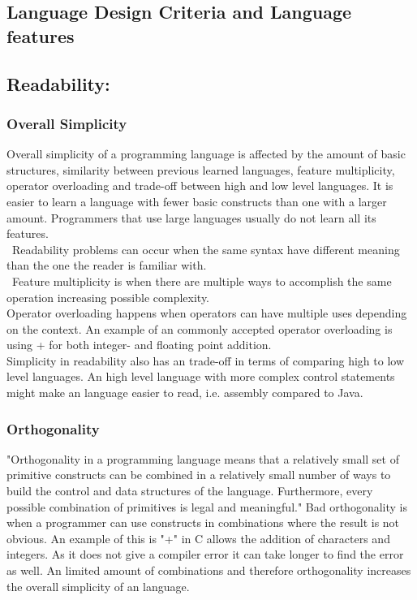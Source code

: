 \subsection{Language Design Criteria and Language features}
\label{language-design-criteria}
\label{design-criteria-theory}
\subsection*{Readability:}
\subsubsection*{Overall Simplicity}
Overall simplicity of a programming language is affected by the amount of basic structures, similarity between previous learned languages, feature multiplicity, operator overloading and trade-off between high and low level languages.
It is easier to learn a language with fewer basic constructs than one with a larger amount. Programmers that use large languages usually do not learn all its features. \\\
Readability problems can occur when the same syntax have different meaning than the one the reader is familiar with.  \\\
Feature multiplicity is when there are multiple ways to accomplish the same operation increasing possible complexity. \\
Operator overloading happens when operators can have multiple uses depending on the context. An example of an commonly accepted operator overloading is using + for both integer- and floating point addition. \\
Simplicity in readability also has an trade-off in terms of comparing high to low level languages. An high level language with more complex control statements might make an language easier to read, i.e. assembly compared to Java.

\subsubsection*{Orthogonality}
"Orthogonality in a programming language means that a relatively small set
of primitive constructs can be combined in a relatively small number of ways
to build the control and data structures of the language. Furthermore, every possible combination of primitives is legal and meaningful."
Bad orthogonality is when a programmer can use constructs in combinations where the result is not obvious. An example of this is "+" in C allows the addition of characters and integers. As it does not give a compiler error it can take longer to find the error as well.
An limited amount of combinations and therefore orthogonality increases the overall simplicity of an language.

